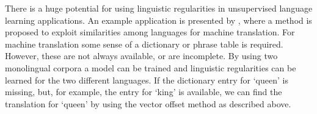 \documentclass[11pt]{article}
\begin{document}
There is a huge potential for using linguistic regularities in unsupervised language learning applications. An example application is presented by \cite{MikolovMT:13}, where a method is proposed to exploit similarities among languages for machine translation. For machine translation some sense of a dictionary or phrase table is required. However, these are not always available, or are incomplete. By using two monolingual corpora a model can be trained and linguistic regularities can be learned for the two different languages. If the dictionary entry for `queen' is missing, but, for example, the entry for `king' is available, we can find the translation for `queen' by using the vector offset method as described above.
\end{document}
